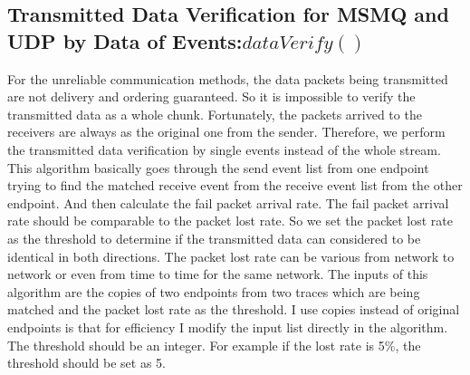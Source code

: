 \subsection{Transmitted Data Verification for MSMQ and UDP by Data of Events:$dataVerify()$}
For the unreliable communication methods, the data packets being transmitted are not delivery and ordering guaranteed. So it is impossible to verify the transmitted data as a whole chunk. Fortunately, the packets arrived to the receivers are always as the original one from the sender. Therefore, we perform the transmitted data verification by single events instead of the whole stream. This algorithm basically goes through the send event list from one endpoint trying to find the matched receive event from the receive event list from the other endpoint. And then calculate the fail packet arrival rate. The fail packet arrival rate should be comparable to the packet lost rate. So we set the packet lost rate as the threshold to determine if the transmitted data can considered to be identical in both directions. The packet lost rate can be various from network to network or even from time to time for the same network. The inputs of this algorithm are the copies of two endpoints from two traces which are being matched and the packet lost rate as the threshold. I use copies instead of original endpoints is that for efficiency I modify the input list directly in the algorithm. The threshold should be an integer. For example if the lost rate is 5\%, the threshold should be set as 5. 
